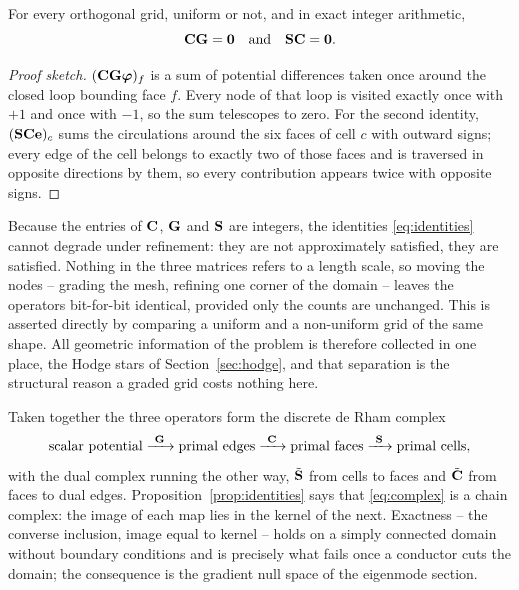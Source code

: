 \begin{proposition}
\label{prop:identities}
For every orthogonal grid, uniform or not, and in exact integer arithmetic,
\begin{equation}
  \mathbf{C}\mathbf{G} = \mathbf{0} \quad\text{and}\quad \mathbf{S}\mathbf{C} = \mathbf{0}.
  \label{eq:identities}
\end{equation}
\end{proposition}

\begin{proof}[Proof sketch]
$(\mathbf{C}\mathbf{G}\boldsymbol\varphi)_f$ is a sum of potential differences taken once around the closed loop bounding
face $f$. Every node of that loop is visited exactly once with $+1$ and once with $-1$, so the sum telescopes to
zero. For the second identity, $(\mathbf{S}\mathbf{C}\mathbf{e})_c$ sums the circulations around the six faces of cell $c$
with outward signs; every edge of the cell belongs to exactly two of those faces and is traversed in opposite
directions by them, so every contribution appears twice with opposite signs.
\end{proof}

\begin{remark}
Because the entries of $\mathbf{C}$, $\mathbf{G}$ and $\mathbf{S}$ are integers, the identities \eqref{eq:identities} cannot
degrade under refinement: they are not approximately satisfied, they are satisfied. Nothing in the three matrices
refers to a length scale, so moving the nodes -- grading the mesh, refining one corner of the domain -- leaves the
operators bit-for-bit identical, provided only the counts are unchanged. This is asserted directly by comparing a
uniform and a non-uniform grid of the same shape. All geometric information of the problem is therefore collected
in one place, the Hodge stars of Section~\ref{sec:hodge}, and that separation is the structural reason a graded
grid costs nothing here.
\end{remark}

Taken together the three operators form the discrete de Rham complex
\begin{equation}
  \text{scalar potential} \xrightarrow{\ \Gmat\ } \text{primal edges} \xrightarrow{\ \Cmat\ } \text{primal faces}
  \xrightarrow{\ \Smat\ } \text{primal cells},
  \label{eq:complex}
\end{equation}
with the dual complex running the other way, $\tilde{\mathbf{S}}$ from cells to faces and $\tilde{\mathbf{C}}$ from faces to dual
edges. Proposition~\ref{prop:identities} says that \eqref{eq:complex} is a chain complex: the image of each map
lies in the kernel of the next. Exactness -- the converse inclusion, image equal to kernel -- holds on a simply
connected domain without boundary conditions and is precisely what fails once a conductor cuts the domain; the
consequence is the gradient null space of the eigenmode section.

